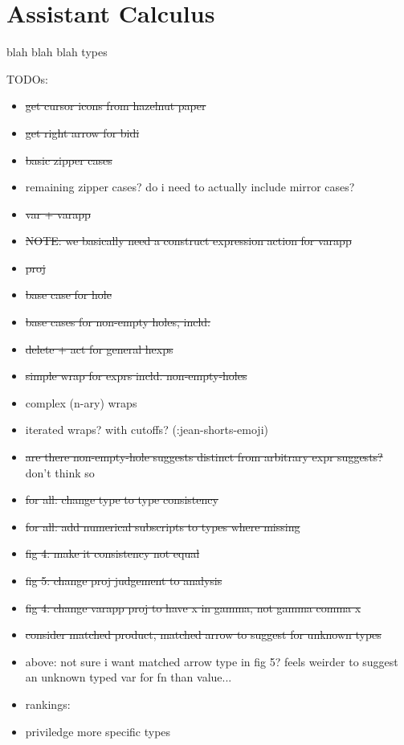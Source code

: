 \section{Assistant Calculus}\label{sec:assistant-calculus}

blah blah blah types

TODOs:
\begin{itemize}
    \item \sout{get cursor icons from hazelnut paper}
    \item \sout{get right arrow for bidi}
    \item \sout{basic zipper cases}
    \item remaining zipper cases? do i need to actually include mirror cases?
    \item \sout{var + varapp}
    \item \sout{NOTE: we basically need a construct expression action for varapp}
    \item \sout{proj}
    \item \sout{base case for hole}
    \item \sout{base cases for non-empty holes, incld:}
    \item \sout{delete + act for general hexps}
    \item \sout{simple wrap for exprs incld. non-empty-holes}
    \item complex (n-ary) wraps
    \item iterated wraps? with cutoffs? (:jean-shorts-emoji)
    \item \sout{are there non-empty-hole suggests distinct from arbitrary expr suggests?} don't think so
    \item \sout{for all: change type to type consistency}
    \item \sout{for all: add numerical subscripts to types where missing}
    \item \sout{fig 4: make it consistency not equal}
    \item \sout{fig 5: change proj judgement to analysis}
    \item \sout{fig 4: change varapp proj to have x in gamma, not gamma comma x}
    \item \sout{consider matched product, matched arrow to suggest for unknown types}
    \item above: not sure i want matched arrow type in fig 5? feels weirder to suggest an unknown typed var for fn than value...
    \item rankings:
    \item priviledge more specific types

\end{itemize}
